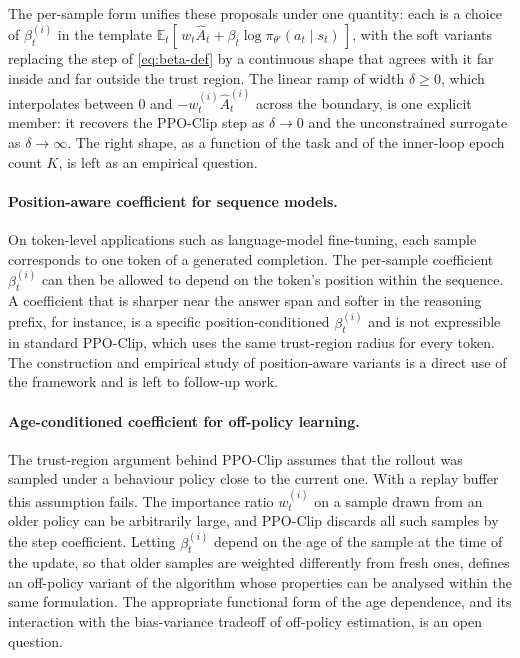 \documentclass{article}
\begin{document}
The per-sample form unifies these proposals under one quantity: each
is a choice of $\beta_t^{(i)}$ in the template
$\mathbb{E}_t[\,w_t \hat{A}_t + \beta_t \log\pi_{\theta'}(a_t \mid
s_t)\,]$, with the soft variants replacing the step of
\eqref{eq:beta-def} by a continuous shape that agrees with it far
inside and far outside the trust region. The linear ramp of width
$\delta \ge 0$, which interpolates between $0$ and
$-w_t^{(i)}\hat{A}_t^{(i)}$ across the boundary, is one explicit
member: it recovers the PPO-Clip step as $\delta \to 0$ and the
unconstrained surrogate as $\delta \to \infty$. The right shape, as a
function of the task and of the inner-loop epoch count $K$, is left as
an empirical question.


\paragraph{Position-aware coefficient for sequence models.}
On token-level applications such as language-model fine-tuning, each
sample corresponds to one token of a generated completion. The
per-sample coefficient $\beta_t^{(i)}$ can then be allowed to depend
on the token's position within the sequence. A coefficient that is
sharper near the answer span and softer in the reasoning prefix, for
instance, is a specific position-conditioned $\beta_t^{(i)}$ and is
not expressible in standard PPO-Clip, which uses the same
trust-region radius for every token. The construction and empirical
study of position-aware variants is a direct use of the framework
and is left to follow-up work.

\paragraph{Age-conditioned coefficient for off-policy learning.}
The trust-region argument behind PPO-Clip assumes that the rollout
was sampled under a behaviour policy close to the current one. With
a replay buffer this assumption fails. The importance ratio
$w_t^{(i)}$ on a sample drawn from an older policy can be
arbitrarily large, and PPO-Clip discards all such samples by the
step coefficient. Letting $\beta_t^{(i)}$ depend on the age of the
sample at the time of the update, so that older samples are weighted
differently from fresh ones, defines an off-policy variant of the
algorithm whose properties can be analysed within the same
formulation. The appropriate functional form of the age dependence,
and its interaction with the bias-variance tradeoff of off-policy
estimation, is an open question.
\end{document}
